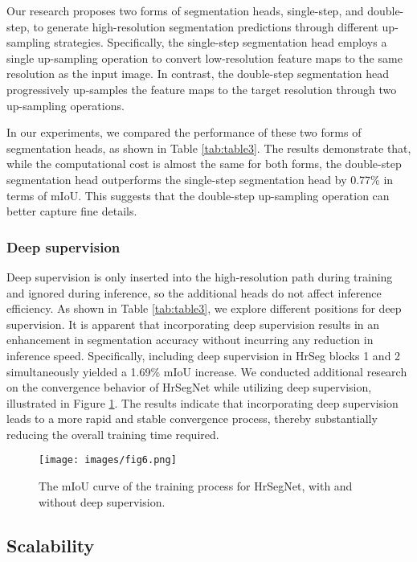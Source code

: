 \documentclass[preprint,12pt,authoryear]{elsarticle}
\begin{document}
Our research proposes two forms of segmentation heads, single-step, and double-step, to generate high-resolution segmentation predictions through different up-sampling strategies. Specifically, the single-step segmentation head employs a single up-sampling operation to convert low-resolution feature maps to the same resolution as the input image. In contrast, the double-step segmentation head progressively up-samples the feature maps to the target resolution through two up-sampling operations.

In our experiments, we compared the performance of these two forms of segmentation heads, as shown in Table \ref{tab:table3}. The results demonstrate that, while the computational cost is almost the same for both forms, the double-step segmentation head outperforms the single-step segmentation head by 0.77\% in terms of mIoU. This suggests that the double-step up-sampling operation can better capture fine details. 

\subsubsection{Deep supervision}

Deep supervision is only inserted into the high-resolution path during training and ignored during inference, so the additional heads do not affect inference efficiency. As shown in Table \ref{tab:table3}, we explore different positions for deep supervision. It is apparent that incorporating deep supervision results in an enhancement in segmentation accuracy without incurring any reduction in inference speed. Specifically, including deep supervision in HrSeg blocks 1 and 2 simultaneously yielded a 1.69\% mIoU increase. We conducted additional research on the convergence behavior of HrSegNet while utilizing deep supervision, illustrated in Figure \ref{fig:fig6}. The results indicate that incorporating deep supervision leads to a more rapid and stable convergence process, thereby substantially reducing the overall training time required.

\begin{figure}[t]
    \centering
    \texttt{[image: images/fig6.png]}
    \caption{The mIoU curve of the training process for HrSegNet, with and without deep supervision.} %
    \label{fig:fig6}
\end{figure}


\subsection{Scalability}
\end{document}
